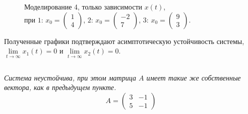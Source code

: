 \documentclass[a5paper, 10pt]{article}
\theoremstyle{definition}
\theoremstyle{plain}
\theoremstyle{remark}
\begin{document}
\begin{figure}[h!]
\caption{Моделирование 4, только зависимости $x(t)$,\\ при  $1: \, x_0 = \begin{pmatrix} 1 \\ 4 \end{pmatrix}$, $2: \, x_0 = \begin{pmatrix} -2 \\ 7 \end{pmatrix}$, $3: \, x_0 = \begin{pmatrix} 9 \\ 3 \end{pmatrix}$.}
\end{figure}
\newpage
Полученные графики подтверждают асимптотическую устойчивость системы, $\lim \limits_{t \to \infty} x_1 (t) = 0$ и $\lim \limits_{t \to \infty} x_2 (t) = 0$.


\newpage
\subsection{}
\textit{Система неустойчива, при этом матрица $A$ имеет такие же собственные вектора, как в предыдущем пункте.}
\begin{equation}
A =
\begin{pmatrix}
3 & -1  \\
5 & -1
\end{pmatrix}
\end{equation}
\end{document}
